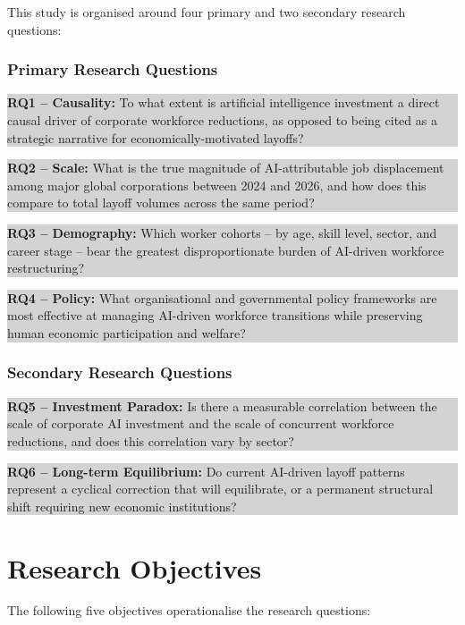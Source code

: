\documentclass[12pt, a4paper]{article}
\newcommand{\rqbox}[2]{%
  \noindent\colorbox{lightgray}{\parbox{\dimexpr\linewidth-2\fboxsep}%
  {\small\textbf{#1:} #2}}\vspace{4pt}}
\begin{document}
This study is organised around four primary and two secondary research questions:

\subsubsection*{Primary Research Questions}

\rqbox{RQ1 -- Causality}{To what extent is artificial intelligence investment a direct
causal driver of corporate workforce reductions, as opposed to being cited as a strategic
narrative for economically-motivated layoffs?}

\rqbox{RQ2 -- Scale}{What is the true magnitude of AI-attributable job displacement among
major global corporations between 2024 and 2026, and how does this compare to total layoff
volumes across the same period?}

\rqbox{RQ3 -- Demography}{Which worker cohorts -- by age, skill level, sector, and career
stage -- bear the greatest disproportionate burden of AI-driven workforce restructuring?}

\rqbox{RQ4 -- Policy}{What organisational and governmental policy frameworks are most
effective at managing AI-driven workforce transitions while preserving human economic
participation and welfare?}

\subsubsection*{Secondary Research Questions}

\rqbox{RQ5 -- Investment Paradox}{Is there a measurable correlation between the scale of
corporate AI investment and the scale of concurrent workforce reductions, and does this
correlation vary by sector?}

\rqbox{RQ6 -- Long-term Equilibrium}{Do current AI-driven layoff patterns represent a
cyclical correction that will equilibrate, or a permanent structural shift requiring new
economic institutions?}

\section{Research Objectives}

The following five objectives operationalise the research questions:
\end{document}
